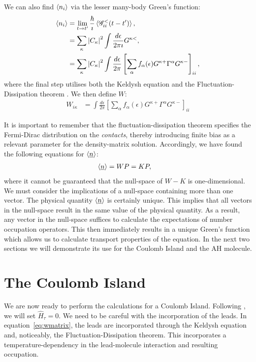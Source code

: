 \documentclass{article}
\begin{document}
\begin{multicols}{2}
        
        We can also find $\braket{n_i}$ via the lesser many-body Green's function:
        \begin{align*}
            \braket{n_i} &= \lim_{t\rightarrow t'} \frac{\hbar}{\imath} \braket{\mathscr{G}^<_{ii}(t-t')}, \\
            &= \sum_\kappa \left|C_\kappa\right|^2 \int \frac{d\epsilon}{2 \pi \imath} G^{\kappa<}, \\
            &= \sum_\kappa \left|C_\kappa\right|^2 \int \frac{d\epsilon}{2 \pi} \left[ \sum_\alpha f_\alpha(\epsilon) G^{\kappa+} \Gamma^\alpha G^{\kappa-}\right]_{ii},
        \end{align*}
        where the final step utilises both the Keldysh equation \cite{diventra} and the Fluctuation-Dissipation theorem \cite{haugjauho}. We then define $W$:
        \begin{align}
        \label{eq:wmatrix}
        W_{i\kappa} &= \int \frac{d\epsilon}{2 \pi} \left[ \sum_\alpha f_\alpha(\epsilon) G^{\kappa+} \Gamma^\alpha G^{\kappa-}\right]_{ii}
        \end{align}
         
        It is important to remember that the fluctuation-dissipation theorem specifies the Fermi-Dirac distribution on the \emph{contacts}, thereby introducing finite bias as a relevant parameter for the density-matrix solution. Accordingly, we have found the following equations for $\braket{\underline{n}}$:
        \begin{align}
            \braket{\underline{n}} &= WP = KP\label{eq:selfconsistent},
        \end{align}
        where it cannot be guaranteed that the null-space of $W-K$ is one-dimensional. We must consider the implications of a null-space containing more than one vector. The physical quantity $\braket{\underline{n}}$ is certainly unique. This implies that all vectors in the null-space result in the same value of the physical quantity. As a result, any vector in the null-space suffices to calculate the expectations of number occupation operators. This then immediately results in a unique Green's function which allows us to calculate transport properties of the equation. In the next two sections we will demonstrate its use for the Coulomb Island and the AH molecule.



    \section{The Coulomb Island}\label{sec:island}
        We are now ready to perform the calculations for a Coulomb Island. Following \citet{haugjauho}, we will set $\hat{H}_\tau = 0$. We need to be careful with the incorporation of the leads. In equation~\ref{eq:wmatrix}, the leads are incorporated through the Keldysh equation and, noticeably, the Fluctuation-Dissipation theorem. This incorporates a temperature-dependency in the lead-molecule interaction and resulting occupation.
        

\end{multicols}
\end{document}
